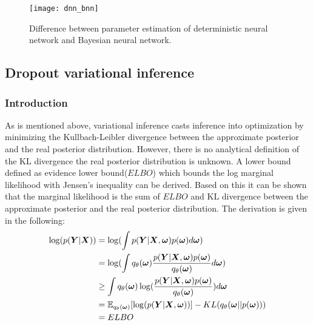 \begin{figure}[H]
	\begin{center}
		\texttt{[image: dnn\_bnn]}
		\caption{Difference between parameter estimation of deterministic neural network and Bayesian neural network.  }		
		\label{fig:dnn_bnn}
	\end{center}
\end{figure}

\subsection{Dropout variational inference}
\subsubsection{Introduction}

As is mentioned above, variational inference  casts inference into optimization by minimizing the Kullbach-Leibler divergence  between the approximate posterior and the real posterior distribution. However, there is no analytical definition of the KL divergence  the real posterior distribution is unknown. A lower bound defined as evidence lower bound($ELBO$) which bounds the log marginal likelihood with Jensen's inequality can be derived. Based on this it can be shown that the marginal likelihood is the sum of $ELBO$ and KL divergence between the approximate posterior and the real posterior distribution. The derivation is given in the following:
\begin{equation}\label{2.6}	
\begin{aligned}
\log(p(\boldsymbol{Y}|\boldsymbol{X})) & = \log(\int p(\boldsymbol{Y}| \boldsymbol{X}, \boldsymbol{\omega})  p(\boldsymbol{\omega})d\boldsymbol{\omega}) \\	 
& = \log(\int{q_{\theta}(\boldsymbol{\omega}) \frac{p(\boldsymbol{Y}| \boldsymbol{X}, \boldsymbol{\omega}) p(\boldsymbol{\omega})}{q_{\theta}(\boldsymbol{\omega})}d\boldsymbol{\omega}}) \\
& \geq \int q_{\theta}(\boldsymbol{\omega}) \log( \frac{p(\boldsymbol{Y}| \boldsymbol{X}, \boldsymbol{\omega}) p(\boldsymbol{\omega})}{q_{\theta}(\boldsymbol{\omega})}) d\boldsymbol{\omega} \\
& = \mathbb E_{q_{\theta}(\boldsymbol{\omega})}[\log(p(\boldsymbol{Y}| \boldsymbol{X}, \boldsymbol{\omega}))] -  KL(q_{\theta}(\boldsymbol{\omega}||p(\boldsymbol{\omega})))\\
& = ELBO
\end{aligned}
\end{equation}

